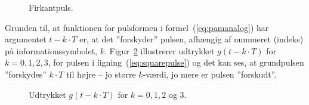 \documentclass[dvips,11pt,a4paper]{article}
\begin{document}
\begin{figure}[htbp]
\centering
{}
\caption{\label{fig:pam003}Firkantpuls.}
\end{figure}

\noindent{}Grunden til, at funktionen for pulsformen i formel~(\ref{eq:pamanalog}) har argumentet $t-k\cdot{}T$ er, at det ''forskyder'' pulsen, afhængig af nummeret (indeks) på informationssymbolet, $k$.  Figur~\ref{fig:pam002} illustrerer udtrykket $g(t-k\cdot{}T)$ for $k=0,1,2,3$, for pulsen i ligning~(\ref{eq:squarepulse}) og det kan ses, at grundpulsen ''forskydes'' $k\cdot{}T$ til højre -- jo større $k$-værdi, jo mere er pulsen ''forskudt''.
\begin{figure}[htbp]
\centering
{}
\caption{\label{fig:pam002}Udtrykket $g(t-k\cdot{}T)$ for $k = 0,1,2$ og $3$.}
\end{figure}
\end{document}
